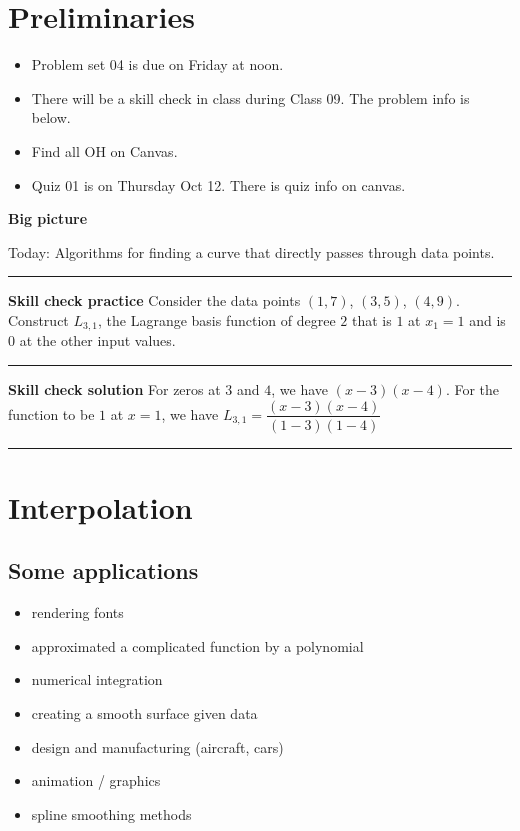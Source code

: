 \documentclass[12pt,letterpaper,noanswers]{exam}
\begin{document}
 \pdfpageheight 11in 
  \pdfpagewidth 8.5in

\noindent 

\section*{Preliminaries}

\begin{itemize}
\itemsep0pt
\item Problem set 04 is due on Friday at noon.
\item There will be a skill check in class during Class 09.  The problem info is below.
\item Find all OH on Canvas.
\item Quiz 01 is on Thursday Oct 12.  There is quiz info on canvas.
\end{itemize}



\noindent\textbf{Big picture}

Today: Algorithms for finding a curve that directly passes through data points.

\vspace{0.2cm}
\hrule
\vspace{0.2cm}

\noindent \textbf{Skill check practice}
 Consider the data points $(1,7)$, $(3, 5)$, $(4, 9)$.  Construct $L_{3,1}$, the Lagrange basis function of degree $2$ that is $1$ at $x_1 = 1$ and is $0$ at the other input values.



\vspace{0.2cm}
\hrule
\vspace{0.2cm}

\noindent \textbf{Skill check solution}
For zeros at $3$ and $4$, we have $(x-3)(x-4)$.  For the function to be $1$ at $x = 1$, we have $L_{3,1} = \dfrac{(x-3)(x-4)}{(1-3)(1-4)}$

\vspace{0.2cm}
\hrule
\vspace{0.2cm}


\section*{Interpolation}
\subsection*{Some applications}
\begin{multicols}{2}
\begin{itemize}
\itemsep0pt
    \item rendering fonts
    \item approximated a complicated function by a polynomial
    \item numerical integration
    \item creating a smooth surface given data
    \item design and manufacturing (aircraft, cars)
    \item animation / graphics
    \item spline smoothing methods
\end{itemize}
\end{multicols}
\end{document}
